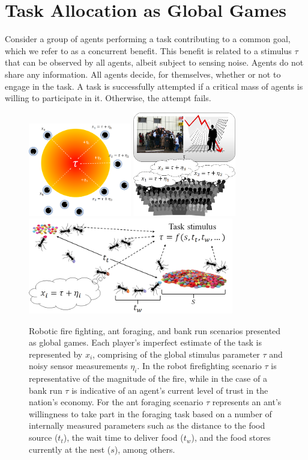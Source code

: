 \documentclass[smallextended]{svjour3}       %
\begin{document}
\section{Task Allocation as Global Games}\label{sec:globalgame}
Consider a group of agents performing a task contributing to a common goal, which we refer to as a concurrent benefit. This benefit is related to a stimulus $\tau$ that can be observed by all agents, albeit subject to sensing noise. Agents do not share any information. All agents decide, for themselves, whether or not to engage in the task. A task is successfully attempted if a critical mass of agents is willing to participate in it. Otherwise, the attempt fails.

\begin{figure}[ht!]
        \centering\includegraphics[width=0.4\textwidth]{figures/firefighting.png}
        \centering\includegraphics[width=0.4\textwidth]{figures/bankrun.png}
        \centering\includegraphics[width=0.8\textwidth]{figures/foraging.png}
    \caption{Robotic fire fighting, ant foraging, and bank run scenarios presented as global games. Each player's imperfect estimate of the task is represented by $x_i$, comprising of the global stimulus parameter $\tau$ and noisy sensor measurements $\eta_i$. In the robot firefighting scenario $\tau$ is representative of the magnitude of the fire, while in the case of a bank run $\tau$ is indicative of an agent's current level of trust in the nation's economy. For the ant foraging scenario $\tau$ represents an ant's willingness to take part in the foraging task based on a number of internally measured parameters such as the distance to the food source ($t_t$), the wait time to deliver food ($t_w$), and the food stores currently at the nest ($s$), among others.\label{fig:motivation}}    

\end{figure}
\end{document}
